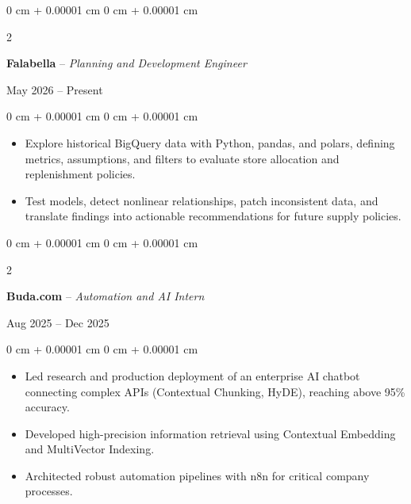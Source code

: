 \documentclass[10pt, letterpaper]{article}
\newenvironment{highlights}{
    \begin{itemize}[
        topsep=0.10 cm,
        parsep=0.10 cm,
        partopsep=0pt,
        itemsep=0pt,
        leftmargin=0 cm + 10pt
    ]
}{
    \end{itemize}
} %
\newenvironment{onecolentry}{
    \begin{adjustwidth}{
        0 cm + 0.00001 cm
    }{
        0 cm + 0.00001 cm
    }
}{
    \end{adjustwidth}
} %
\newenvironment{twocolentry}[2][]{
    \onecolentry
    \def\secondColumn{#2}
    \setcolumnwidth{\fill, 4.5 cm}
    \begin{paracol}{2}
}{
    \switchcolumn \raggedleft \secondColumn
    \end{paracol}
    \endonecolentry
} %
\begin{document}
    \begin{twocolentry}{May 2026 -- Present}
        \textbf{Falabella} -- \textit{Planning and Development Engineer}
    \end{twocolentry}
    \vspace{0.10 cm}
    \begin{onecolentry}
        \begin{highlights}
            \item Explore historical BigQuery data with Python, pandas, and polars, defining metrics, assumptions, and filters to evaluate store allocation and replenishment policies.
            \item Test models, detect nonlinear relationships, patch inconsistent data, and translate findings into actionable recommendations for future supply policies.
        \end{highlights}
    \end{onecolentry}
    \vspace{0.2 cm}

    \begin{twocolentry}{Aug 2025 -- Dec 2025}
        \textbf{Buda.com} -- \textit{Automation and AI Intern}
    \end{twocolentry}
    \vspace{0.10 cm}
    \begin{onecolentry}
        \begin{highlights}
            \item Led research and production deployment of an enterprise AI chatbot connecting complex APIs (Contextual Chunking, HyDE), reaching above 95\% accuracy.
            \item Developed high-precision information retrieval using Contextual Embedding and MultiVector Indexing.
            \item Architected robust automation pipelines with n8n for critical company processes.
        \end{highlights}
    \end{onecolentry}
    \vspace{0.2 cm}
\end{document}
